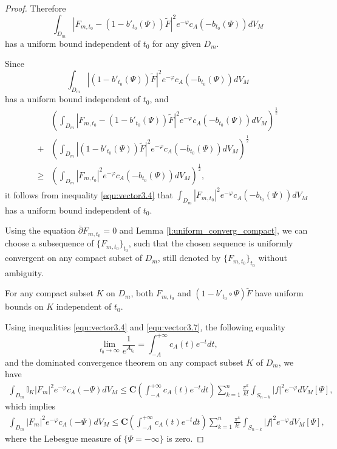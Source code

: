 \begin{proof}
Therefore
$$\int_{ D_m}|F_{m,t_0}-(1-b'_{t_0}(\Psi))\tilde{F}|^{2}e^{-\varphi}c_{A}(-b_{t_0}(\Psi))dV_{M}$$
has a uniform bound independent of $t_{0}$ for any given $D_m$.

Since
$$\int_{ D_m}|(1-b'_{t_0}(\Psi))\tilde{F}|^{2}e^{-\varphi}c_{A}(-b_{t_0}(\Psi))dV_{M}$$
has a uniform bound independent of $t_{0}$,  and
\begin{equation}
\label{equ:vector3.9}
\begin{split}
&(\int_{ D_m}|F_{m,t_0}-(1-b'_{t_0}(\Psi))\tilde{F}|^{2}e^{-\varphi}c_{A}(-b_{t_0}(\Psi))dV_{M})^{\frac{1}{2}}
\\+&(\int_{ D_m}|(1-b'_{t_0}(\Psi))\tilde{F}|^{2}e^{-\varphi}c_{A}(-b_{t_0}(\Psi))dV_{M})^{\frac{1}{2}}
\\\geq&
(\int_{ D_m}|F_{m,t_0}|^{2}e^{-\varphi}c_{A}(-b_{t_0}(\Psi))dV_{M})^{\frac{1}{2}},
\end{split}
\end{equation}
it follows from inequality \ref{equ:vector3.4} that
$\int_{D_m}|F_{m,t_0}|^{2}e^{-\varphi}c_{A}(-b_{t_0}(\Psi))dV_{M}$
has a uniform bound independent of $t_{0}$.

Using the equation $\bar\partial F_{m,t_{0}}=0$ and Lemma
\ref{l:uniform_converg_compact}, we can choose a subsequence of
$\{F_{m,t_{0}}\}_{t_{0}}$, such that the chosen sequence is
uniformly convergent on any compact subset of $D_m$, still denoted
by $\{F_{m,t_0}\}_{t_{0}}$ without ambiguity.

For any compact subset $K$ on $D_m$, both $F_{m,t_0}$ and
$(1-b'_{t_0}\circ\Psi)\tilde{F}$ have uniform bounds on $K$
independent of $t_0$.

Using inequalities \ref{equ:vector3.4} and \ref{equ:vector3.7}, the
following equality
$$\lim_{t_{0}\to\infty}\frac{1}{e^{A_{t_0}}}=\int_{-A}^{+\infty}c_{A}(t)e^{-t}dt,$$
and the dominated convergence theorem on any compact subset $K$ of
$D_m$, we have
\begin{equation}
\begin{split}
\int_{D_m}\mathbb{I}_{K}|F_{m}|^{2}e^{-\varphi}c_{A}(-\Psi)dV_{M}
\leq\mathbf{C}(\int_{-A}^{+\infty}c_{A}(t)e^{-t}dt)\sum_{k=1}^{n}\frac{\pi^{k}}{k!}
\int_{S_{n-k}}|f|^{2}e^{-\varphi}dV_{M}[\Psi],
\end{split}
\end{equation}
which implies
\begin{equation}
\begin{split}
\int_{ D_m}|F_{m}|^{2}e^{-\varphi}c_{A}(-\Psi)dV_{M}
\leq\mathbf{C}(\int_{-A}^{+\infty}c_{A}(t)e^{-t}dt)\sum_{k=1}^{n}
\frac{\pi^{k}}{k!}\int_{S_{n-k}}|f|^{2}e^{-\varphi}dV_{M}[\Psi],
\end{split}
\end{equation}
where the Lebesgue measure of $\{\Psi=-\infty\}$ is zero.


\end{proof}
